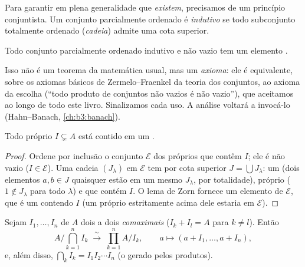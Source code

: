 Para garantir em plena generalidade que  \emph{existem},
precisamos de um princípio conjuntista. Um conjunto parcialmente
ordenado é \emph{indutivo} se todo subconjunto totalmente ordenado
(\emph{cadeia}) admite uma cota superior.

\begin{theorem}\label{thm:b3:rings:zorn}
Todo conjunto parcialmente ordenado indutivo e não vazio tem um
elemento .
\admitted
\end{theorem}

\begin{remark}\label{rem:b3:rings:zorn}
Isso não é um teorema da matemática usual, mas um \emph{axioma}: ele é
equivalente, sobre os axiomas básicos de Zermelo--Fraenkel da teoria dos
conjuntos, ao axioma da escolha (``todo produto de conjuntos não vazios
é não vazio''), que aceitamos ao longo de todo este livro. Sinalizamos
cada uso. A análise voltará a invocá-lo (Hahn--Banach,
\cref{ch:b3:banach}).
\end{remark}

\begin{theorem}[Krull]\label{thm:b3:rings:krull}
Todo  próprio $I \subsetneq A$ está contido em um .
\end{theorem}

\begin{proof}
Ordene por inclusão o conjunto $\mathcal E$ dos  próprios que contêm
$I$; ele é não vazio ($I \in \mathcal E$). Uma cadeia $(J_\lambda)$ em $\mathcal E$ tem por cota
superior $J = \bigcup
J_\lambda$: um  (dois elementos $a, b \in J$ quaisquer estão em um
mesmo $J_\lambda$, por totalidade), próprio ($1 \notin J_\lambda$ para todo $\lambda$) e que
contém $I$. O lema de Zorn fornece um elemento  de $\mathcal
E$,
que é um  contendo $I$ (um  próprio estritamente
acima dele estaria em $\mathcal E$).
\end{proof}

\begin{theorem}\label{thm:b3:rings:crt}
Sejam $I_1, \dots, I_n$  de $A$ dois a dois
\emph{comaximais} ($I_k + I_l = A$ para $k \neq l$). Então
\[
A\Big/\bigcap_{k=1}^n I_k \;\xrightarrow{\;\sim\;}\;
\prod_{k=1}^n A/I_k,
\qquad
a \longmapsto (a + I_1, \dots, a + I_n),
\]
e, além disso, $\bigcap_k I_k = I_1 I_2 \cdots I_n$ (o  gerado pelos produtos).
\end{theorem}

